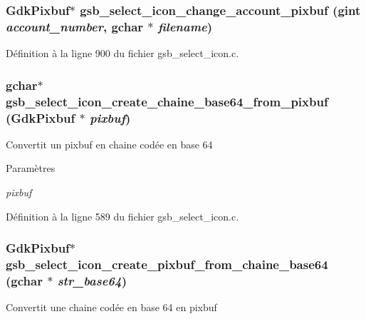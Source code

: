 \subsubsection[{gsb\_\-select\_\-icon\_\-change\_\-account\_\-pixbuf}]{\setlength{\rightskip}{0pt plus 5cm}GdkPixbuf$\ast$ gsb\_\-select\_\-icon\_\-change\_\-account\_\-pixbuf (gint {\em account\_\-number}, \/  gchar $\ast$ {\em filename})}\label{gsb__select__icon_8c_a23dd4e54e74de71e50ae75cd1310e50a}


Définition à la ligne 900 du fichier gsb\_\-select\_\-icon.c.

\subsubsection[{gsb\_\-select\_\-icon\_\-create\_\-chaine\_\-base64\_\-from\_\-pixbuf}]{\setlength{\rightskip}{0pt plus 5cm}gchar$\ast$ gsb\_\-select\_\-icon\_\-create\_\-chaine\_\-base64\_\-from\_\-pixbuf (GdkPixbuf $\ast$ {\em pixbuf})}\label{gsb__select__icon_8c_a0821d91b9c32c62c3d2adb1b19d2a02c}
Convertit un pixbuf en chaine codée en base 64


\begin{DoxyParams}{Paramètres}
\item[{\em pixbuf}]\end{DoxyParams}


Définition à la ligne 589 du fichier gsb\_\-select\_\-icon.c.

\subsubsection[{gsb\_\-select\_\-icon\_\-create\_\-pixbuf\_\-from\_\-chaine\_\-base64}]{\setlength{\rightskip}{0pt plus 5cm}GdkPixbuf$\ast$ gsb\_\-select\_\-icon\_\-create\_\-pixbuf\_\-from\_\-chaine\_\-base64 (gchar $\ast$ {\em str\_\-base64})}\label{gsb__select__icon_8c_a8a86f51d893c834b23e3278352f38944}
Convertit une chaine codée en base 64 en pixbuf


